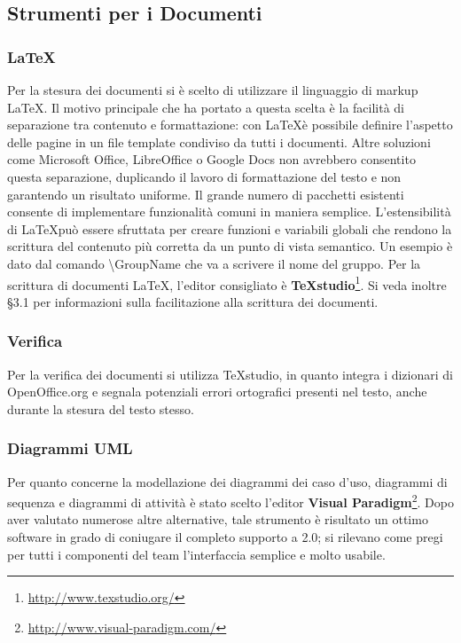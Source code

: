 \subsection{Strumenti per i Documenti}
\subsubsection{\LaTeX}
Per la stesura dei documenti si è scelto di utilizzare il linguaggio di markup \LaTeX. Il motivo principale che ha portato a questa scelta è la facilità di separazione tra contenuto e formattazione: con \LaTeX è possibile definire l'aspetto delle pagine in un file template condiviso da tutti i documenti. Altre soluzioni come Microsoft Office, LibreOffice o Google Docs non avrebbero consentito questa separazione, duplicando il lavoro di formattazione del testo e non garantendo un risultato uniforme. Il grande numero di pacchetti esistenti consente di implementare funzionalità comuni in maniera semplice. L'estensibilità di \LaTeX può essere sfruttata per creare funzioni e variabili globali che rendono la scrittura del contenuto più corretta da un punto di
vista semantico. Un esempio è dato dal comando \textbackslash GroupName che va a scrivere il nome del gruppo. Per la scrittura di documenti \LaTeX, l'editor consigliato è \textbf{TeXstudio}\footnote[2]{\url{http://www.texstudio.org/}}. Si veda inoltre §3.1 per informazioni sulla facilitazione alla scrittura dei documenti.

\subsubsection{Verifica}
Per la verifica dei documenti si utilizza TeXstudio, in quanto integra i dizionari di OpenOffice.org e segnala potenziali errori ortografici presenti nel testo, anche durante la stesura del testo stesso.

\subsubsection{Diagrammi UML}

Per quanto concerne la modellazione dei diagrammi dei caso d'uso, diagrammi di sequenza e diagrammi di attività è stato scelto l'editor \textbf{Visual Paradigm}\footnote[3]{\url{http://www.visual-paradigm.com/}}. Dopo aver valutato numerose altre alternative, tale strumento è risultato un ottimo software in grado di coniugare il completo supporto a  2.0; si rilevano come pregi per tutti i componenti del team l'interfaccia semplice e molto usabile.

